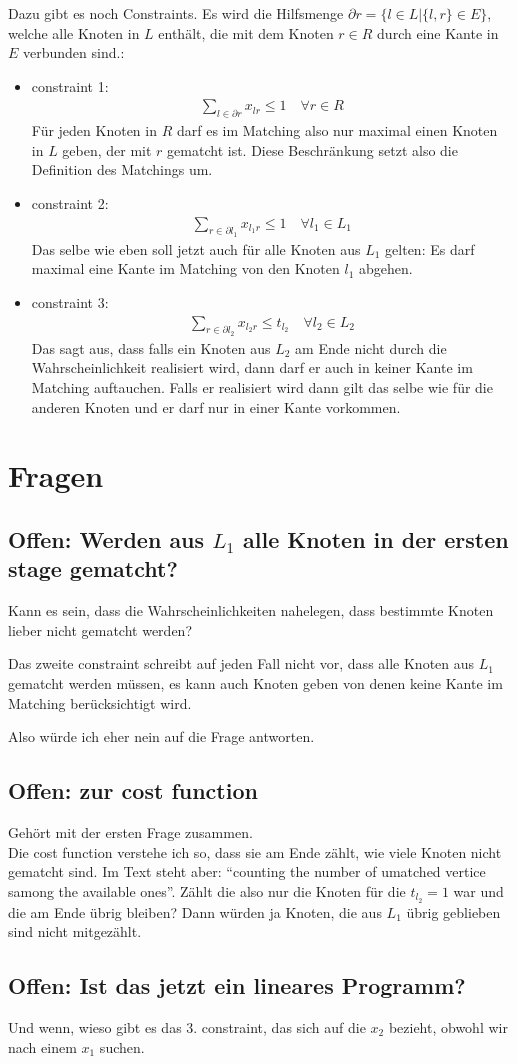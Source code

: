 \documentclass[paper=a4,10pt]{scrartcl}
\begin{document}
Dazu gibt es noch Constraints. Es wird die Hilfsmenge $\partial r = \{l\in L | \{l,r\} \in E \}$, welche alle Knoten in $L$ enthält, die mit dem Knoten $r\in R$ durch eine Kante in $E$ verbunden sind.:
\begin{itemize}
\item constraint 1:
 \begin{align}
\sum_{l\in \partial r} x_{lr} \le 1 \quad \forall r\in R
\end{align} 
Für jeden Knoten in $R$ darf es im Matching also nur maximal einen Knoten in $L$ geben, der mit $r$ gematcht ist. Diese Beschränkung setzt also die Definition des Matchings um. 
\item constraint 2:
 \begin{align}
\sum_{r\in \partial l_1} x_{l_1r} \le 1 \quad \forall l_1\in L_1
\end{align} 
Das selbe wie eben soll jetzt auch für alle Knoten aus $L_1$ gelten: Es darf maximal eine Kante im Matching von den Knoten $l_1$ abgehen.
\item constraint 3:
\begin{align}
\sum_{r\in \partial l_2} x_{l_2r} \le t_{l_2} \quad \forall l_2\in L_2
\end{align}
Das sagt aus, dass falls ein Knoten aus $L_2$ am Ende nicht durch die Wahrscheinlichkeit realisiert wird, dann darf er auch in keiner Kante im Matching auftauchen. Falls er realisiert wird dann gilt das selbe wie für die anderen Knoten und er darf nur in einer Kante vorkommen. 
\end{itemize}

\section{Fragen}
\subsection{Offen: Werden aus $L_1$ alle Knoten in der ersten stage gematcht?}
Kann es sein, dass die Wahrscheinlichkeiten nahelegen, dass bestimmte Knoten lieber nicht gematcht werden?

Das zweite constraint schreibt auf jeden Fall nicht vor, dass alle Knoten aus $L_1$ gematcht werden müssen, es kann auch Knoten geben von denen keine Kante im Matching berücksichtigt wird.

Also würde ich eher nein auf die Frage antworten. 

\subsection{Offen: zur cost function}
Gehört mit der ersten Frage zusammen.\\
Die cost function verstehe ich so, dass sie am Ende zählt, wie viele Knoten nicht gematcht sind. Im Text steht aber: ``counting the number of umatched vertice samong the available ones''. Zählt die also nur die Knoten für die $t_{l_2}=1$ war und die am Ende übrig bleiben? Dann würden ja Knoten, die aus $L_1$ übrig geblieben sind nicht mitgezählt. 

\subsection{Offen: Ist das jetzt ein lineares Programm?}
Und wenn, wieso gibt es das 3. constraint, das sich auf die $x_2$ bezieht, obwohl wir nach einem $x_1$ suchen. 
\end{document}
